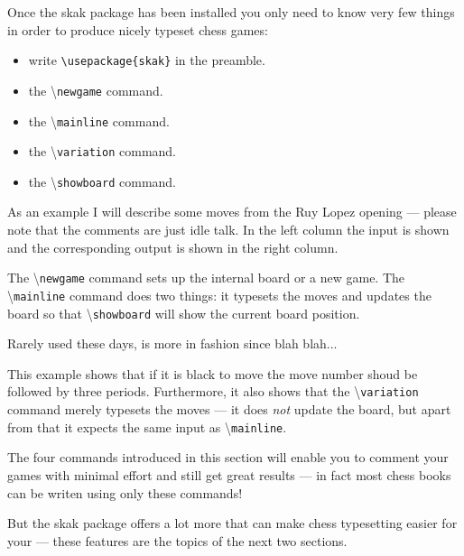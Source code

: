 \documentclass[10pt]{article}
\makeatletter
\renewcommand\showboard{\print@board}
\let\ORIshowboard\showboard
\renewcommand\showboard{%
    \makebox[8\squarelength]{%
    \rule{0pt}{9\squarelength}%
    \begin{postscript}%
    [trim = \squarelength{} 0pt \squarelength{} 0pt]
    \ORIshowboard
    \end{postscript}}}
\newcommand{\package}[1]{\textsf{#1}}
\newcommand{\command}[1]{\textbackslash\texttt{#1}}
\makeatother
\begin{document}
Once the \package{skak} package has been installed you only need to
know very few things in order to produce nicely typeset chess games:

\begin{itemize}
\item write \verb|\usepackage{skak}| in the preamble.
\item the \command{newgame} command.
\item the \command{mainline} command.
\item the \command{variation} command.
\item the \command{showboard} command.
\end{itemize}

As an example I will describe some moves from the Ruy Lopez opening
--- please note that the comments are just idle talk. In the left
column the input is shown and the corresponding output is shown in the
right column.

\begin{LTXexample}
\newgame
{}

\showboard
\end{LTXexample}

The \command{newgame} command sets up the internal board or a new
game. The \command{mainline} command does two things: it typesets the
moves and updates the board so that \command{showboard} will show the
current board position.

\begin{LTXexample}
 
Rarely used these days,
 is more in
fashion since blah blah...

\showboard
\end{LTXexample}



This example shows that if it is black to move the move number shoud
be followed by three periods. Furthermore, it also shows that the
\command{variation} command merely typesets the moves --- it does
\emph{not} update the board, but apart from that it expects the same
input as \command{mainline}.

The four commands introduced in this section will enable you to
comment your games with minimal effort and still get great results ---
in fact most chess books can be writen using only these commands!

But the \package{skak} package offers a lot more that can make chess
typesetting easier for your --- these features are the topics of the
next two sections.
\end{document}

